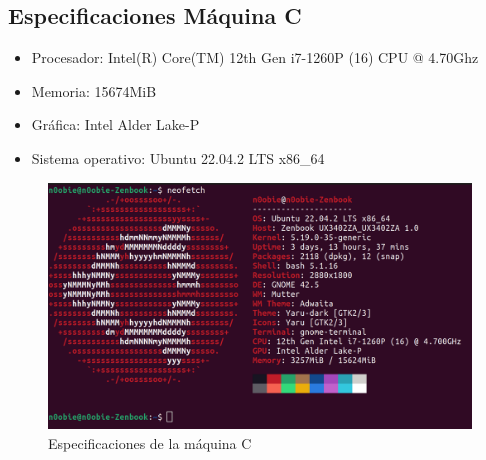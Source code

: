 \newpage

\subsection{Especificaciones Máquina C}
\label{maquina_C}
\begin{itemize}
    \item Procesador: Intel(R) Core(TM) 12th Gen i7-1260P (16) CPU @ 4.70Ghz
    \item Memoria: 15674MiB
    \item Gráfica: Intel Alder Lake-P
    \item Sistema operativo: Ubuntu 22.04.2 LTS x86\_64
\end{itemize}
\begin{figure}[ht!]
    \centering
    \includegraphics[width=\textwidth]{archivos/img/anexos/maquinaC.png}
    \caption{Especificaciones de la máquina C}
    \label{fig:maquinaC}
\end{figure}

